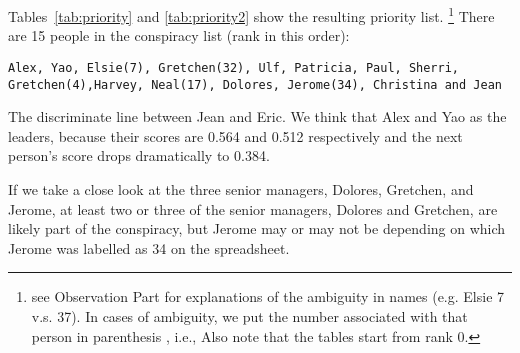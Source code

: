 \documentclass{icmmcm}
\begin{document}
Tables~\ref{tab:priority} and \ref{tab:priority2}
show the resulting priority list.
\footnote{see Observation Part for explanations of the ambiguity in names (e.g. Elsie 7 v.s. 37). In cases of ambiguity,
we put the number associated with that person in parenthesis
, i.e., 
Also note that the tables
start from rank 0.}
There are 15 people in the conspiracy list (rank in this order):
\begin{verbatim}
Alex, Yao, Elsie(7), Gretchen(32), Ulf, Patricia, Paul, Sherri, Gretchen(4),Harvey, Neal(17), Dolores, Jerome(34), Christina and Jean 
\end{verbatim}

The discriminate line between Jean and Eric. We think that
Alex and Yao as the leaders, because their scores are
0.564 and 0.512 respectively and the next person's score
drops dramatically to 0.384.

If we take a close look at the three senior managers, 
Dolores, Gretchen, and Jerome, at least two or three of the senior managers, Dolores and Gretchen, are likely part of the conspiracy, but Jerome may or may not be depending on which Jerome was labelled as 34 on the spreadsheet.
\end{document}
